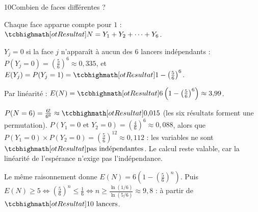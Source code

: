 \begin{corrige}{10}{Combien de faces différentes ?}
\begin{questions}
  \item Chaque face apparue compte pour $1$ : $\res{N=Y_1+Y_2+\dots+Y_6}$.
  \item $Y_j=0$ si la face $j$ n'apparaît à aucun des $6$ lancers indépendants : $P(Y_j=0)=\left(\frac56\right)^{6}\approx0{,}335$, et
    $E(Y_j)=P(Y_j=1)=\res{1-\left(\frac56\right)^{6}}$.
  \item Par linéarité : $E(N)=\res{6\left(1-\left(\frac56\right)^{6}\right)\approx3{,}99}$.
  \item $P(N=6)=\frac{6!}{6^{6}}\approx\res{0{,}015}$ (les six résultats forment une permutation). $P(Y_1=0\text{ et }Y_2=0)=\left(\frac46\right)^{6}\approx0{,}088$,
    alors que $P(Y_1=0)\times P(Y_2=0)=\left(\frac56\right)^{12}\approx0{,}112$ : les variables ne sont $\res{\text{pas indépendantes}}$. Le calcul reste
    valable, car la linéarité de l'espérance n'exige pas l'indépendance.
  \item Le même raisonnement donne $E(N)=6\left(1-\left(\frac56\right)^{n}\right)$. Puis $E(N)\geq5\iff\left(\frac56\right)^{n}\leq\frac16\iff
    n\geq\frac{\ln(1/6)}{\ln(5/6)}\approx9{,}8$ : à partir de $\res{10\text{ lancers}}$.
\end{questions}
\end{corrige}
